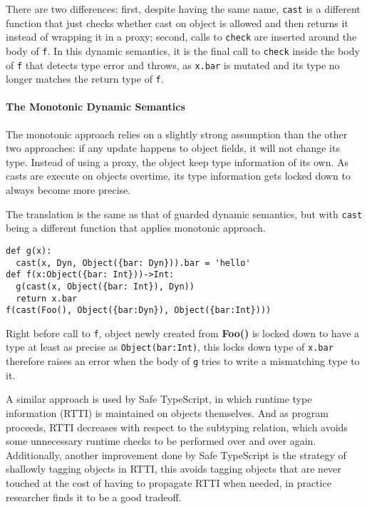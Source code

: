 There are two differences: first, despite having the same name, \texttt{cast} is a different
function that just checks whether cast on object is allowed and then returns it instead
of wrapping it in a proxy; second, calls to \texttt{check} are inserted around the body of \texttt{f}.
In this dynamic semantics, it is the final call to \texttt{check} inside the body of \texttt{f} that
detects type error and throws, as \texttt{x.bar} is mutated and its type no longer matches the return
type of \texttt{f}.

\paragraph{The Monotonic Dynamic Semantics}

The monotonic approach relies on a slightly strong assumption than the other two approaches:
if any update happens to object fields, it will not change its type.
Instead of using a proxy, the object keep type information of its own. As casts are execute on objects
overtime, its type information gets locked down to always become more precise.

The translation is the same as that of guarded dynamic semantics, but with \texttt{cast} being a different
function that applies monotonic approach.

\begin{verbatim}
def g(x):
  cast(x, Dyn, Object({bar: Dyn})).bar = 'hello'
def f(x:Object({bar: Int}))->Int:
  g(cast(x, Object({bar: Int}), Dyn))
  return x.bar
f(cast(Foo(), Object({bar:Dyn}), Object({bar:Int})))
\end{verbatim}

Right before call to \texttt{f}, object newly created from \textbf{Foo()} is locked down to
have a type at least as precise as \texttt{Object({bar:Int})}, this locks down type of \texttt{x.bar}
therefore raises an error when the body of \texttt{g} tries to write a mismatching type to it.

A similar approach is used by Safe TypeScript, in which runtime type information (RTTI) is maintained on
objects themselves. And as program proceeds, RTTI decreases with respect to the subtyping relation,
which avoids some unnecessary runtime checks to be performed over and over again.
Additionally, another improvement done by Safe TypeScript is
the strategy of shallowly tagging objects in RTTI, this avoids tagging objects that are never touched
at the cost of having to propagate RTTI when needed, in practice researcher finds it to be a good tradeoff.

